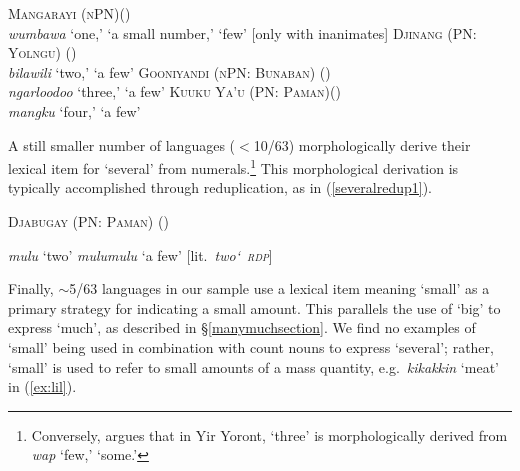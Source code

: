 \documentclass[12pt,egregdoesnotlikesansseriftitles]{scrartcl}
\begin{document}

\begin{exe}
\ex \textsc{Mangarayi (nPN)}\hfill (\citealt[93]{merlan89})\\
\textit{wumbawa} `one,' `a small number,' `few' [only with inanimates] \label{fewex0}
  \ex \textsc{Djinang (PN: Yolngu)} \hfill(\citealt[9]{waters83})\\
  \textit{bilawili} `two,' `a few' \label{fewex1}
  \ex \textsc{Gooniyandi (nPN: Bunaban)} \hfill (\citealt[149]{mcgregor90}) \label{fewex2}\\
  \textit{ngarloodoo} `three,' `a few'
  \ex \textsc{Kuuku Ya'u (PN: Paman)}\hfill (\citealt[27,82]{thompson88})\\
  \textit{mangku} `four,' `a few' \label{fewex3}
\end{exe}

A still smaller number of languages ($<$10/63) morphologically derive their lexical item for `several' from numerals.\footnote{Conversely, \citet[51]{alpher73} argues that in Yir Yoront, \textit{} `three' is morphologically derived from \textit{wap} `few,' `some.'} This morphological derivation is typically accomplished through reduplication, as in (\ref{severalredup1}).


\begin{exe}
    \ex \textsc{Djabugay (PN: Paman)} \hfill (\citealt[87]{patz91}) \label{severalredup1}
  \begin{xlist}
    \ex \textit{mulu} `two'
    \ex \textit{mulumulu} `a few' [lit.\ \textit{two\char`~\textsc{rdp}}]
  \end{xlist}
\end{exe}

Finally, $\sim$5/63 languages in our sample use a lexical item meaning `small' as a primary strategy for indicating a small amount. This parallels the use of `big' to express `much', as described in \S\ref{manymuchsection}. We find no examples of `small' being used in combination with count nouns to express `several'; rather, `small' is used to refer to small amounts of a mass quantity, e.g.\ \textit{kikakkin} `meat' in (\ref{ex:lil}).
\end{document}
